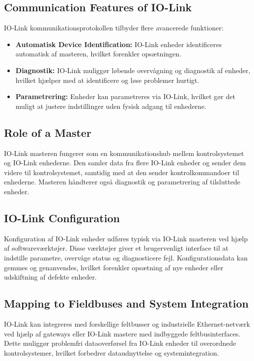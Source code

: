\subsection{Communication Features of IO-Link}
IO-Link kommunikationsprotokollen tilbyder flere avancerede funktioner:
\begin{itemize}
	\item \textbf{Automatisk Device Identification:} IO-Link enheder identificeres automatisk af masteren, hvilket forenkler opsætningen.
	\item \textbf{Diagnostik:} IO-Link muliggør løbende overvågning og diagnostik af enheder, hvilket hjælper med at identificere og løse problemer hurtigt.
	\item \textbf{Parametrering:} Enheder kan parametreres via IO-Link, hvilket gør det muligt at justere indstillinger uden fysisk adgang til enhederne.
\end{itemize}

\subsection{Role of a Master}
IO-Link masteren fungerer som en kommunikationshub mellem kontrolsystemet og IO-Link enhederne. Den samler data fra flere IO-Link enheder og sender dem videre til kontrolsystemet, samtidig med at den sender kontrolkommandoer til enhederne. Masteren håndterer også diagnostik og parametrering af tilsluttede enheder.

\subsection{IO-Link Configuration}
Konfiguration af IO-Link enheder udføres typisk via IO-Link masteren ved hjælp af softwareværktøjer. Disse værktøjer giver et brugervenligt interface til at indstille parametre, overvåge status og diagnosticere fejl. Konfigurationsdata kan gemmes og genanvendes, hvilket forenkler opsætning af nye enheder eller udskiftning af defekte enheder.

\subsection{Mapping to Fieldbuses and System Integration}
IO-Link kan integreres med forskellige feltbusser og industrielle Ethernet-netværk ved hjælp af gateways eller IO-Link mastere med indbyggede feltbusinterfaces. Dette muliggør problemfri dataoverførsel fra IO-Link enheder til overordnede kontrolsystemer, hvilket forbedrer dataudnyttelse og systemintegration.

